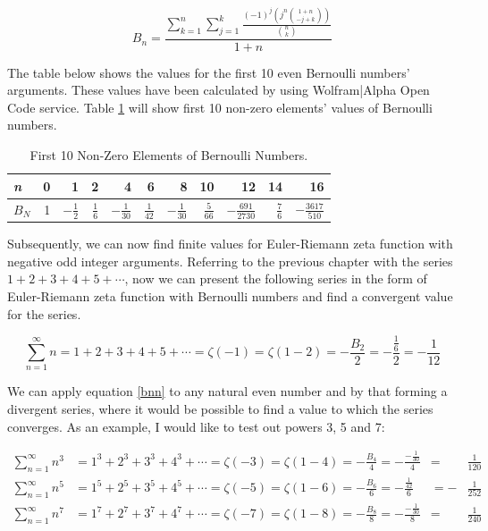 \documentclass[11pt]{article}
\begin{document}
\begin{equation*}
  B_n=\frac{\sum_{k=1}^{n} \sum_{j=1}^{k} \frac{(-1)^j (j^n \binom{1+n}{-j+k}) }{\binom{n}{k}} }{1+n}
  \end{equation*}

The table below shows the values for the first 10 even Bernoulli numbers'
arguments. These values have been calculated by using Wolfram|Alpha Open Code
service. Table \ref{tab:orge351542} will show first 10 non-zero elements' values
of Bernoulli numbers. 

\begin{table}[htbp]
\caption{\label{tab:orge351542}
First 10 Non-Zero Elements of Bernoulli Numbers.}
\centering
\begin{tabular}{lrrrrrrrrrr}
\emph{n} & 0 & 1 & 2 & 4 & 6 & 8 & 10 & 12 & 14 & 16\\
\hline
\(B_N\) & 1 & \(-\frac{1}{2}\) & \(\frac{1}{6}\) & \(-\frac{1}{30}\) & \(\frac{1}{42}\) & \(-\frac{1}{30}\) & \(\frac{5}{66}\) & \(-\frac{691}{2730}\) & \(\frac{7}{6}\) & \(-\frac{3617}{510}\)\\
\end{tabular}
\end{table}


Subsequently, we can now find finite values for Euler-Riemann zeta function with
negative odd integer arguments. Referring to the previous chapter with the
series \(1+2+3+4+5+\cdots\), now we can present the following series in the form of
Euler-Riemann zeta function with Bernoulli numbers and find a convergent value
for the series. 

\begin{equation}
  \sum_{n=1}^{\infty} n = 1+2+3+4+5+\cdots=\zeta(-1)=\zeta(1-2)=-\frac{B_2}{2}=
  -\frac{\frac{1}{6}}{2}=-\frac{1}{12}
  \end{equation}

We can apply equation \ref{bnn} to any natural even number and by that forming a
divergent series, where it would be possible to find a value to which the series
converges. As an example, I would like to test out powers 3, 5 and 7: 

\begin{align*}
  \sum_{n=1}^{\infty}n^3&=1^3+2^3+3^3+4^3+\cdots=\zeta(-3)=\zeta(1-4)=
  -\frac{B_4}{4}=-\frac{-\frac{1}{30}}{4}&=&\frac{1}{120}\\
  \sum_{n=1}^{\infty}n^5&=1^5+2^5+3^5+4^5+\cdots=\zeta(-5)=\zeta(1-6)=
  -\frac{B_6}{6}=-\frac{\frac{1}{42}}{6}&=-&\frac{1}{252}\\
  \sum_{n=1}^{\infty}n^7&=1^7+2^7+3^7+4^7+\cdots=\zeta(-7)=\zeta(1-8)=
  -\frac{B_8}{8}=-\frac{-\frac{1}{30}}{8}&=&\frac{1}{240}
\end{align*}
\end{document}
